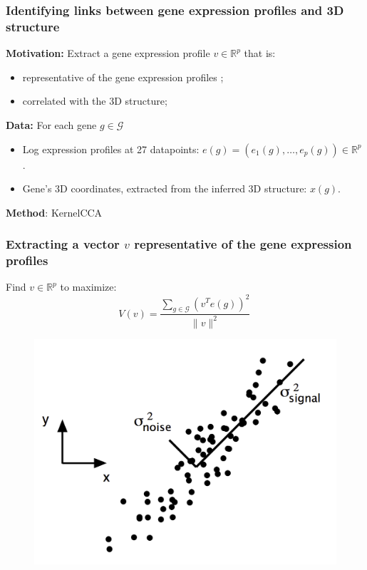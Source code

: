 \documentclass[xcolor=dvipsnames]{beamer}
\begin{document}

\begin{frame}
\frametitle{Identifying links between gene expression profiles and 3D structure}
{\color{Blue} \textbf{Motivation:}} Extract a gene expression profile 
$v \in \mathbb{R}^p$ that is:
\begin{itemize}[label={$\bullet$}]

\item representative of the gene expression profiles ;
\item correlated with the 3D structure;
\end{itemize}
\vspace{1em}
{\color{Blue} \textbf{Data:}}
For each gene $g \in \mathcal{G}$
\begin{itemize}[label={$\bullet$}]
\item Log expression profiles at 27 datapoints: $e(g) = \left( e_1(g), \ldots, e_p(g)\right) \in \mathbb{R}^p$ .
\item Gene's 3D coordinates, extracted from the inferred 3D structure: $x(g)$.
\end{itemize}
\vspace{1em}
{\color{Blue} \textbf{Method}:}
 KernelCCA \citep{vert:graph, bach:kernel}

\end{frame}

\begin{frame}
\frametitle{Extracting a vector $v$ representative of the gene expression
profiles}
Find $v \in \mathbb{R}^p$ to maximize:
\begin{equation*}\label{eq:variance}
V(v) = \frac{\sum_{g \in \mathcal{G}} \left(v^T e(g)\right)^2}{\|v\|^2}\,
\end{equation*}

\begin{figure}
\includegraphics[width=0.5\linewidth]{figures/pca.png}
\end{figure}
\end{frame}
\end{document}
